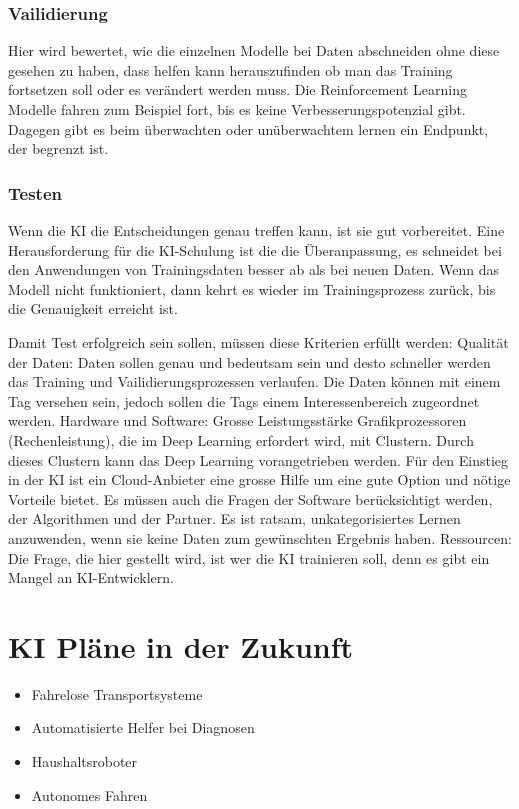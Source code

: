 \documentclass{report}
\begin{document}
\subsubsection{Vailidierung} 
Hier wird bewertet, wie die einzelnen Modelle bei Daten abschneiden ohne diese gesehen zu haben, dass helfen kann herauszufinden ob man das Training fortsetzen soll oder es verändert werden muss. Die Reinforcement Learning Modelle fahren zum Beispiel fort, bis es keine Verbesserungspotenzial gibt. Dagegen gibt es beim überwachten oder unüberwachtem lernen ein Endpunkt, der begrenzt ist. 

\subsubsection{Testen} 
Wenn die KI die Entscheidungen genau treffen kann, ist sie gut vorbereitet. Eine Herausforderung für die KI-Schulung ist die die Überanpassung, es schneidet bei den Anwendungen von Trainingsdaten besser ab als bei neuen Daten. Wenn das Modell nicht funktioniert, dann kehrt es wieder im Trainingsprozess zurück, bis die Genauigkeit erreicht ist. 

Damit Test erfolgreich sein sollen, müssen diese Kriterien erfüllt werden:
Qualität der Daten: Daten sollen genau und bedeutsam sein und desto schneller werden das Training und Vailidierungsprozessen verlaufen.  Die Daten können mit einem Tag versehen sein, jedoch sollen die Tags einem Interessenbereich zugeordnet werden. 
Hardware und Software:
Grosse Leistungsstärke Grafikprozessoren (Rechenleistung), die im Deep Learning erfordert wird, mit Clustern. Durch dieses Clustern kann das Deep Learning vorangetrieben werden.  Für den Einstieg in der KI ist ein Cloud-Anbieter eine grosse Hilfe um eine gute Option und nötige Vorteile bietet. Es müssen auch die Fragen der Software berücksichtigt werden, der Algorithmen und der Partner. Es ist ratsam, unkategorisiertes Lernen anzuwenden, wenn sie keine Daten zum gewünschten Ergebnis haben.
Ressourcen:
Die Frage, die hier gestellt wird, ist wer die KI trainieren soll, denn es gibt ein Mangel an KI-Entwicklern. 

\section {KI Pläne in der Zukunft}
\begin{itemize}
    \item Fahrelose Transportsysteme
    \item Automatisierte Helfer bei Diagnosen
    \item Haushaltsroboter 
    \item Autonomes Fahren
\end{itemize}

\nocite{*}
\printbibliography
\end{document}
